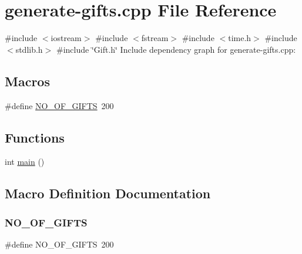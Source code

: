 \hypertarget{generate-gifts_8cpp}{}\section{generate-\/gifts.cpp File Reference}
\label{generate-gifts_8cpp}
{\ttfamily \#include $<$iostream$>$}\newline
{\ttfamily \#include $<$fstream$>$}\newline
{\ttfamily \#include $<$time.\+h$>$}\newline
{\ttfamily \#include $<$stdlib.\+h$>$}\newline
{\ttfamily \#include \char`\"{}Gift.\+h\char`\"{}}\newline
Include dependency graph for generate-\/gifts.cpp\+:
\subsection*{Macros}
\begin{DoxyCompactItemize}
\item 
\#define \hyperlink{generate-gifts_8cpp_a0f2baaec9fb7462d3dd3c4597499ce57}{N\+O\+\_\+\+O\+F\+\_\+\+G\+I\+F\+TS}~200
\end{DoxyCompactItemize}
\subsection*{Functions}
\begin{DoxyCompactItemize}
\item 
int \hyperlink{generate-gifts_8cpp_ae66f6b31b5ad750f1fe042a706a4e3d4}{main} ()
\end{DoxyCompactItemize}


\subsection{Macro Definition Documentation}
\mbox{\label{generate-gifts_8cpp_a0f2baaec9fb7462d3dd3c4597499ce57}} 
\subsubsection{\texorpdfstring{N\+O\+\_\+\+O\+F\+\_\+\+G\+I\+F\+TS}{NO\_OF\_GIFTS}}
{\footnotesize\ttfamily \#define N\+O\+\_\+\+O\+F\+\_\+\+G\+I\+F\+TS~200}



